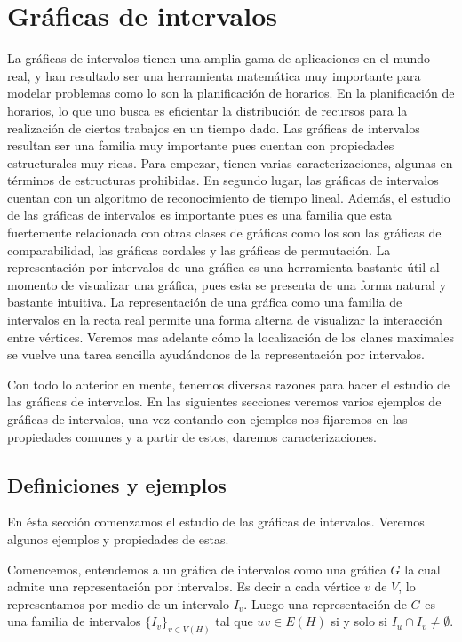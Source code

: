 \chapter{Gráficas de intervalos}
\label{cap:GrafInt}



La gráficas de intervalos tienen una amplia gama de aplicaciones en el mundo real, y han resultado ser una herramienta matemática muy importante para modelar problemas como lo son la planificación de horarios. En la planificación de horarios, lo que uno busca es eficientar la distribución de recursos para la realización de ciertos trabajos en un tiempo dado. 
Las gráficas de intervalos resultan ser una familia muy importante pues cuentan con propiedades estructurales muy ricas. Para empezar, tienen varias caracterizaciones, algunas en términos de estructuras prohibidas. En segundo lugar, las gráficas de intervalos cuentan con un algoritmo de reconocimiento de tiempo lineal. Además, el estudio de las gráficas de intervalos es importante pues es una familia que esta fuertemente relacionada con otras clases de gráficas como los son las gráficas de comparabilidad, las gráficas cordales y las gráficas de permutación. 
La representación por intervalos de una gráfica es una herramienta bastante útil al momento de visualizar una gráfica, pues esta  se presenta de una forma natural y bastante intuitiva. La representación de una gráfica como una familia de intervalos en la recta real permite una forma alterna de visualizar la interacción entre vértices. Veremos mas adelante c\'omo la localización de los clanes maximales se vuelve una tarea sencilla ayudándonos de la representación por intervalos.

Con todo lo anterior en mente, tenemos diversas razones para hacer el estudio de las gráficas de intervalos. En las siguientes secciones veremos varios ejemplos de gráficas de intervalos, una vez contando con ejemplos nos fijaremos en las propiedades comunes y a partir de estos, daremos caracterizaciones.

\section{Definiciones y ejemplos}
En ésta sección comenzamos el estudio  de las gráficas de intervalos. Veremos algunos ejemplos y propiedades de estas.

Comencemos, entendemos a un gráfica de intervalos como una gráfica $G$ la cual admite una representación por intervalos. Es decir a cada vértice $v$ de $V$, lo representamos por medio de un intervalo $I_v$. Luego una representación de $G$ es una familia de intervalos $\{ I_v \}_{v\in V(H)}$ tal que $uv\in E(H)$ si y solo si $I_u \cap I_v \neq \emptyset$.

